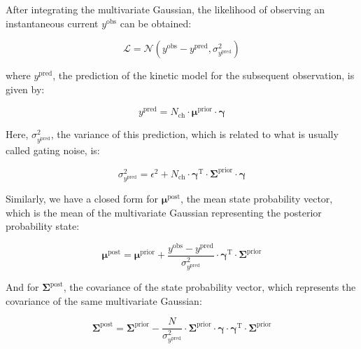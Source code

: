 \documentclass[pdflatex,sn-mathphys-num]{sn-jnl}%
\theoremstyle{thmstyleone}%
\theoremstyle{thmstyletwo}%
\theoremstyle{thmstylethree}%
\begin{document}
After integrating the multivariate Gaussian, the likelihood of observing an instantaneous current \( y^{\text{obs}} \) can be obtained:

\begin{equation}
	\mathcal{L} = \mathcal{N} \left( y^{\text{obs}} - y^{\text{pred}}, \sigma^2_{y^{\text{pred}}} \right)
	\label{eq:macro_likelihood}
\end{equation}

where \( y^{\text{pred}} \), the prediction of the kinetic model for the subsequent observation, is given by:

\begin{equation}
	y^{\text{pred}} = N_{\text{ch}} \cdot \boldsymbol{\mu}^{\text{prior}} \cdot \boldsymbol{\gamma}
	\label{eq:macro_predicted_y}
\end{equation}

Here, \( \sigma^2_{y^{\text{pred}}} \), the variance of this prediction, which is related to what is usually called gating noise, is:

\begin{equation}
	\sigma^2_{y^{\text{pred}}} = \epsilon^2 + N_{\text{ch}} \cdot \boldsymbol{\gamma}^{\mathrm{T}} \cdot \boldsymbol{\Sigma}^{\text{prior}} \cdot \boldsymbol{\gamma}
	\label{eq:macro_sigma_pred}
\end{equation}

Similarly, we have a closed form for \( \boldsymbol{\mu}^{\text{post}} \), the mean state probability vector, which is the mean of the multivariate Gaussian representing the posterior probability state:

\begin{equation}
	\boldsymbol{\mu}^{\text{post}} = \boldsymbol{\mu}^{\text{prior}} + \frac{y^{\text{obs}} - y^{\text{pred}}}{\sigma^2_{y^{\text{pred}}}} \cdot \boldsymbol{\gamma}^{\mathrm{T}} \cdot \boldsymbol{\Sigma}^{\text{prior}}
	\label{eq:macro_mean_posterior}
\end{equation}

And for \( \boldsymbol{\Sigma}^{\text{post}} \), the covariance of the state probability vector, which represents the covariance of the same multivariate Gaussian:

\begin{equation}
	\boldsymbol{\Sigma}^{\text{post}} = \boldsymbol{\Sigma}^{\text{prior}} - \frac{N}{\sigma^2_{y^{\text{pred}}}} \cdot \boldsymbol{\Sigma}^{\text{prior}} \cdot \boldsymbol{\gamma} \cdot \boldsymbol{\gamma}^{\mathrm{T}} \cdot \boldsymbol{\Sigma}^{\text{prior}}
	\label{eq:macro_cov_posterior}
\end{equation}
\end{document}
